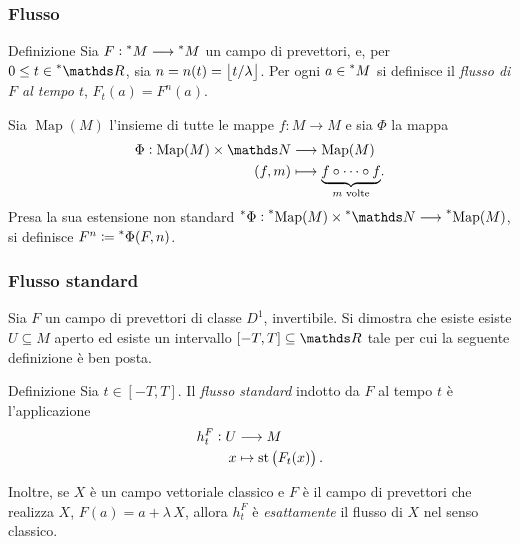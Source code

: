 \documentclass{beamer}
\newenvironment{definizioneb}{\begin{block}{Definizione}}{\end{block}}
\begin{document}
\begin{frame}
    \frametitle{Flusso}

    \begin{definizioneb}
        Sia $ F: \prescript{*}{}{M} \longrightarrow \prescript{*}{}{M} $ un campo di prevettori, e, per $ 0\le t \in \starR $, sia $ n = n(t) = \left\lfloor t/\lambda \right\rfloor $. Per ogni $ a \in \prescript{*}{}{M} $ si definisce il \emph{flusso di $ F $ al tempo $ t $}, $ F_{t}(a) = F^{n}(a) $. 
    \end{definizioneb}

    Sia $ \operatorname{Map}(M) $ l'insieme di tutte le mappe $ f: M \longrightarrow M $ e sia $ \Phi $ la mappa\begin{align*}
    \Phi:\operatorname{Map}(M) \times \N &\longrightarrow \operatorname{Map}(M) \\
    (f,m) &\longmapsto \underset{m\text{ volte}}{\underbrace{f\circ \dots\circ f}}.
    \end{align*}Presa la sua estensione non standard $ \nonstandard{\Phi}: \nonstandard{\operatorname{Map}(M)}\times \nonstandard{\N} \longrightarrow \nonstandard{\operatorname{Map}(M)} $, si definisce $ F^{n} \coloneqq \prescript{*}{}{\Phi}(F,n) $.

\end{frame}


\begin{frame}
    \frametitle{Flusso standard}

    Sia $ F $ un campo di prevettori di classe $ D^{1} $, invertibile. %
    Si dimostra che esiste esiste $ U \subseteq M $ aperto ed esiste un intervallo $ [-T,T] \subseteq \R $ tale per cui la seguente definizione è ben posta.
    
    \begin{definizioneb}
        Sia $ t \in [-T,T] $. Il \emph{flusso standard} indotto da $ F $ al tempo $ t $ è l'applicazione \begin{align*}
            h_{t}^{F}: U &\longrightarrow M \\ 
            x & \mapsto \operatorname{st}\left(F_{t}(x) \right).
        \end{align*}
    \end{definizioneb}

    Inoltre, se $ X $ è un campo vettoriale classico e $ F $ è il campo di prevettori che realizza $ X $, $ F(a) = a + \lambda\,X $, allora $ h_{t}^{F}$ è \emph{esattamente} il flusso di $ X $ nel senso classico. 

\end{frame}
\end{document}
